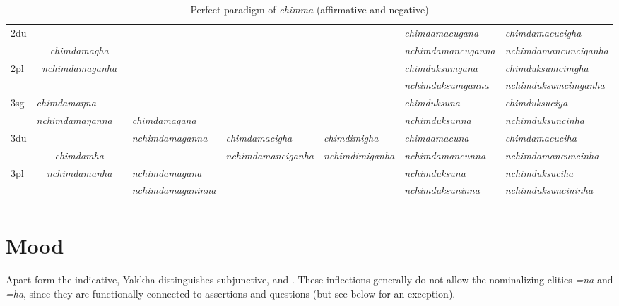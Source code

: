\begin{landscape}
\begin{table}[p]
{\begin{tabular}{l|p{2.8cm}|p{1.6cm}|p{2.8cm}|p{3.0cm}|p{2.8cm}|p{3.2cm}|p{3.6cm}}
 \cline{1-2} \cline{7-8}			
{\sc 2du}		& \multicolumn{2}{c|}{}     & \multicolumn{3}{c|}{\cellcolor[gray]{.8}} & \it  chimdamacugana  & \it   chimdamacucigha \\
		& \multicolumn{2}{c|}{\it chimdamagha} & \multicolumn{3}{c|}{\cellcolor[gray]{.8} }& \it nchimdamancuganna  & \it  nchimdamancunciganha \\
 \cline{1-1} \cline{7-8}			
{\sc 2pl}		& \multicolumn{2}{c|}{\it nchimdamaganha} & \multicolumn{3}{c|}{\cellcolor[gray]{.8} }& \it  chimduksumgana& \it  chimduksumcimgha  \\
		& \multicolumn{2}{c|}{ }& \multicolumn{3}{c|}{ \cellcolor[gray]{.8}}& \it  nchimduksumganna & \it  nchimduksumcimganha \\
\hline			
{\sc 3sg} 		& \it chimdamaŋna	  & \it 	      	& \it   			& \it     & \it     	& \it chimduksuna& \it chimduksuciya\\
		& \it  nchimdamaŋanna   & \it    	& \it  chimdamagana	& \it   & \it    & \it nchimduksunna& \it nchimduksuncinha\\
  \cline{1-2}  \cline{7-8}					
{\sc 3du}&  \multicolumn{2}{c|}{}& \it nchimdamaganna& \it  chimdamacigha& \it chimdimigha& \it   chimdamacuna & \it   chimdamacuciha\\
	& \multicolumn{2}{c|}{\it chimdamha}& \it  & \it nchimdamanciganha& \it  nchimdimiganha & \it  nchimdamancunna & \it  nchimdamancuncinha\\
 \cline{1-1} \cline{4-4} \cline{7-8}	
{\sc 3pl} &  \multicolumn{2}{c|}{\it nchimdamanha}	& \it nchimdamagana& \it  & \it  & \it nchimduksuna& \it nchimduksuciha\\	
	&\multicolumn{2}{c|}{ }& \it nchimdamaganinna& \it & \it  & \it nchimduksuninna& \it nchimduksuncininha \\
\lspbottomrule
\end{tabular}
}
\caption{Perfect paradigm of \emph{chimma}  (affirmative and negative)}\label{par-chimd-prf}
\end{table}

\end{landscape}


\section{Mood}\label{mood}

Apart form the indicative, Yakkha distinguishes subjunctive,  and   . These  inflections generally do not allow the nominalizing clitics \emph{=na} and \emph{=ha}, since they are functionally connected to assertions and questions (but see below for an exception).

